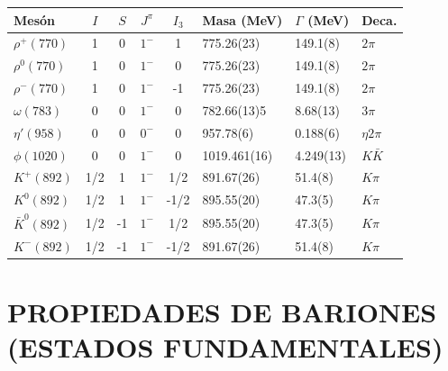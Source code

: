 {
\centering
\begin{tabular}{|l|c|c|c|c|l|l|l|}
\hline
\textbf{Mesón} & $I$ & $S$ & $J^\pi$ & $I_3$ & \textbf{Masa (MeV)} & $\Gamma$ \textbf{(MeV)} & \textbf{Deca.} \\ \hline
$\rho^+(770)$ & 1 & 0 & $1^-$ & 1 & 775.26(23) & 149.1(8) & $2\pi$ \\ \hline
$\rho^0(770)$ & 1 & 0 & $1^-$ & 0 & 775.26(23) & 149.1(8) & $2\pi$ \\ \hline
$\rho^-(770)$ & 1 & 0 & $1^-$ & -1 & 775.26(23) & 149.1(8) & $2\pi$ \\ \hline
$\omega(783)$ & 0 & 0 & $1^-$ & 0 & 782.66(13)5 & 8.68(13) & $3\pi$ \\ \hline
$\eta'(958)$ & 0 & 0 & $0^-$ & 0 & 957.78(6) & 0.188(6) & $\eta 2\pi$ \\ \hline
$\phi(1020)$ & 0 & 0 & $1^-$ & 0 & 1019.461(16) & 4.249(13) & $K\bar{K}$ \\ \hline
$K^+(892)$ & 1/2 & 1 & $1^-$ & 1/2 & 891.67(26) & 51.4(8) & $K\pi$ \\ \hline
$K^0(892)$ & 1/2 & 1 & $1^-$ & -1/2 & 895.55(20) & 47.3(5) & $K\pi$ \\ \hline
$\bar{K}^0(892)$ & 1/2 & -1 & $1^-$ & 1/2 & 895.55(20) & 47.3(5) & $K\pi$ \\ \hline
$K^-(892)$ & 1/2 & -1 & $1^-$ & -1/2 & 891.67(26) & 51.4(8) & $K\pi$ \\ \hline
\end{tabular}

}


\section{PROPIEDADES DE BARIONES (ESTADOS FUNDAMENTALES)}

